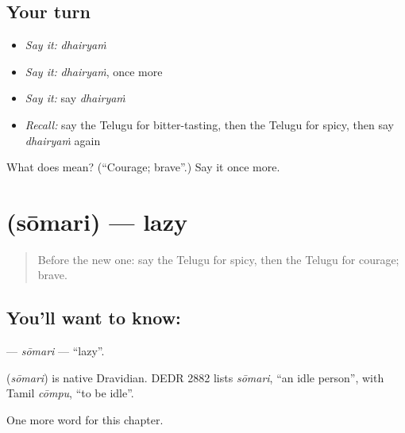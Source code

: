 \subsection*{Your turn}
\begin{itemize}
\raggedright
  \item \emph{Say it:} \emph{dhairyaṁ}
  \item \emph{Say it:} \emph{dhairyaṁ}, once more
  \item \emph{Say it:} say \emph{dhairyaṁ}
  \item \emph{Recall:} say the Telugu for bitter-tasting, then the Telugu for spicy, then say \emph{dhairyaṁ} again
\end{itemize}

\begin{tcolorbox}[breakable,colback=teal!4,colframe=teal!35!black,title={Before you move on}]
What does  mean? (\textquotedblleft{}Courage; brave\textquotedblright{}.) Say it once more.
\end{tcolorbox}
\section[\texorpdfstring{\te{సోమరి} (sōmari)}{సోమరి (sōmari)}]{ (sōmari) — lazy}

\label{lesson:TE-C141-somari}



\begin{quote}
Before the new one: say the Telugu for spicy, then the Telugu for courage; brave.
\end{quote}

\subsection*{You'll want to know: }
\textbf{} — \emph{sōmari} — \textquotedblleft{}lazy\textquotedblright{}.

\begin{cousinweb}
\textbf{} (\emph{sōmari}) is native Dravidian. DEDR 2882 lists \emph{sōmari}, \textquotedblleft{}an idle person\textquotedblright{}, with Tamil \emph{cōmpu}, \textquotedblleft{}to be idle\textquotedblright{}.
\end{cousinweb}

\begin{grammarlens}[title={What you've built}]
One more word for this chapter.
\end{grammarlens}

